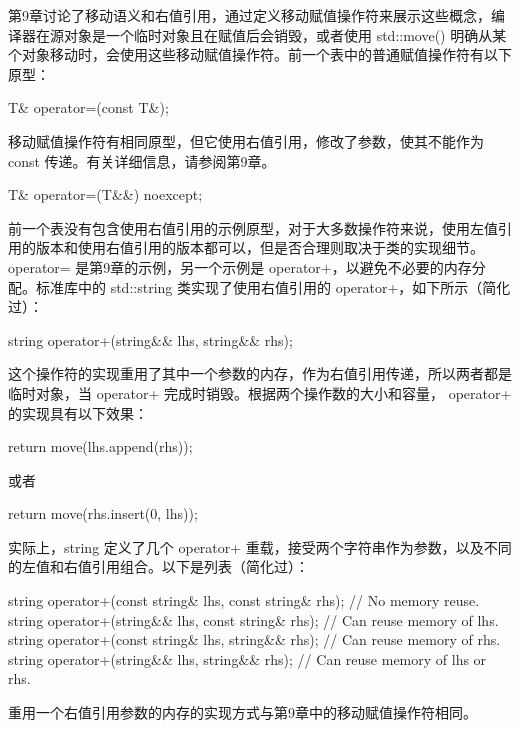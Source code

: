 
第9章讨论了移动语义和右值引用，通过定义移动赋值操作符来展示这些概念，编译器在源对象是一个临时对象且在赋值后会销毁，或者使用 std::move() 明确从某个对象移动时，会使用这些移动赋值操作符。前一个表中的普通赋值操作符有以下原型：

\begin{cpp}
T& operator=(const T&);
\end{cpp}

移动赋值操作符有相同原型，但它使用右值引用，修改了参数，使其不能作为 const 传递。有关详细信息，请参阅第9章。

\begin{cpp}
T& operator=(T&&) noexcept;
\end{cpp}

前一个表没有包含使用右值引用的示例原型，对于大多数操作符来说，使用左值引用的版本和使用右值引用的版本都可以，但是否合理则取决于类的实现细节。operator= 是第9章的示例，另一个示例是 operator+，以避免不必要的内存分配。标准库中的 std::string 类实现了使用右值引用的 operator+，如下所示（简化过）：

\begin{cpp}
string operator+(string&& lhs, string&& rhs);
\end{cpp}

这个操作符的实现重用了其中一个参数的内存，作为右值引用传递，所以两者都是临时对象，当 operator+ 完成时销毁。根据两个操作数的大小和容量， operator+ 的实现具有以下效果：

\begin{cpp}
return move(lhs.append(rhs));
\end{cpp}

或者

\begin{cpp}
return move(rhs.insert(0, lhs));
\end{cpp}

实际上，string 定义了几个 operator+ 重载，接受两个字符串作为参数，以及不同的左值和右值引用组合。以下是列表（简化过）：

\begin{cpp}
string operator+(const string& lhs, const string& rhs); // No memory reuse.
string operator+(string&& lhs, const string& rhs); // Can reuse memory of lhs.
string operator+(const string& lhs, string&& rhs); // Can reuse memory of rhs.
string operator+(string&& lhs, string&& rhs); // Can reuse memory of lhs or rhs.
\end{cpp}

重用一个右值引用参数的内存的实现方式与第9章中的移动赋值操作符相同。

